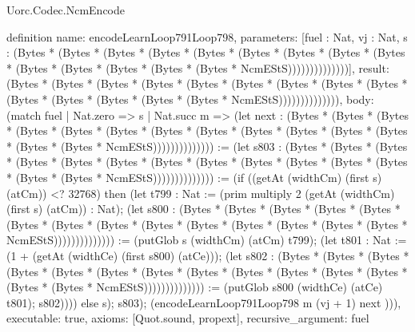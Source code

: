 \begin{lexlean}{Uorc.Codec.NcmEncode}
\begin{semanticmodule}
definition{
  name: encodeLearnLoop791Loop798,
  parameters: [fuel : Nat, vj : Nat, s : (Bytes * (Bytes * (Bytes * (Bytes * (Bytes * (Bytes * (Bytes * (Bytes * (Bytes * (Bytes * (Bytes * (Bytes * (Bytes * (Bytes * NcmEStS))))))))))))))],
  result: (Bytes * (Bytes * (Bytes * (Bytes * (Bytes * (Bytes * (Bytes * (Bytes * (Bytes * (Bytes * (Bytes * (Bytes * (Bytes * (Bytes * NcmEStS)))))))))))))),
  body: (match fuel
    | Nat.zero => s
    | Nat.succ m => (let next : (Bytes * (Bytes * (Bytes * (Bytes * (Bytes * (Bytes * (Bytes * (Bytes * (Bytes * (Bytes * (Bytes * (Bytes * (Bytes * (Bytes * NcmEStS)))))))))))))) := (let s803 : (Bytes * (Bytes * (Bytes * (Bytes * (Bytes * (Bytes * (Bytes * (Bytes * (Bytes * (Bytes * (Bytes * (Bytes * (Bytes * (Bytes * NcmEStS)))))))))))))) := (if ((getAt (widthCm) (first s) (atCm)) <? 32768) then (let t799 : Nat := (prim multiply 2 (getAt (widthCm) (first s) (atCm)) : Nat); (let s800 : (Bytes * (Bytes * (Bytes * (Bytes * (Bytes * (Bytes * (Bytes * (Bytes * (Bytes * (Bytes * (Bytes * (Bytes * (Bytes * (Bytes * NcmEStS)))))))))))))) := (putGlob s (widthCm) (atCm) t799); (let t801 : Nat := (1 + (getAt (widthCe) (first s800) (atCe))); (let s802 : (Bytes * (Bytes * (Bytes * (Bytes * (Bytes * (Bytes * (Bytes * (Bytes * (Bytes * (Bytes * (Bytes * (Bytes * (Bytes * (Bytes * NcmEStS)))))))))))))) := (putGlob s800 (widthCe) (atCe) t801); s802)))) else s); s803); (encodeLearnLoop791Loop798 m (vj + 1) next ))),
  executable: true,
  axioms: [Quot.sound, propext],
  recursive_argument: fuel
}


\end{semanticmodule}
\end{lexlean}
